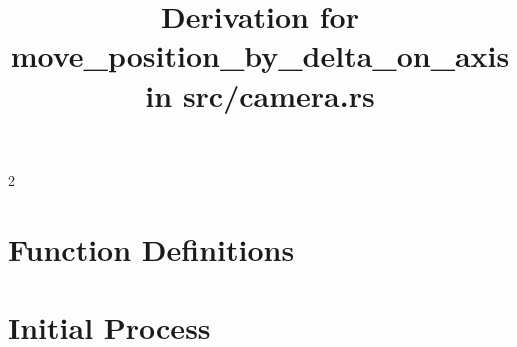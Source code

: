 \documentclass{article}
\begin{document}
\title{Derivation for move\_position\_by\_delta\_on\_axis in src/camera.rs}
\date{}
\maketitle




\raggedcolumns %

\begin{multicols*}{2}

    \raggedbottom

    \section{Function Definitions}
    

    \section{Initial Process}
    

\end{multicols*}

\flushbottom
\end{document}
